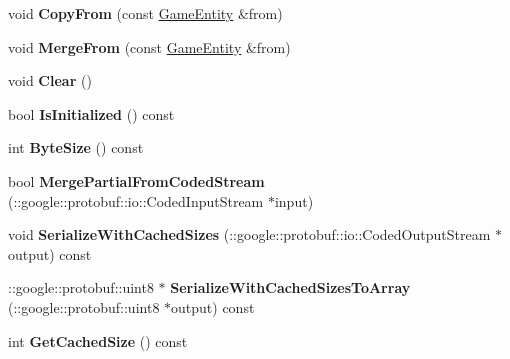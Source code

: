 \begin{DoxyCompactItemize}
\item 
\hypertarget{class_game_entity_ad2e29c89bb229fe7947d5ee8a61001fb}{}void {\bfseries Copy\+From} (const \hyperlink{class_game_entity}{Game\+Entity} \&from)\label{class_game_entity_ad2e29c89bb229fe7947d5ee8a61001fb}

\item 
\hypertarget{class_game_entity_aee3cabc70886a412c84f7046d8f0a28e}{}void {\bfseries Merge\+From} (const \hyperlink{class_game_entity}{Game\+Entity} \&from)\label{class_game_entity_aee3cabc70886a412c84f7046d8f0a28e}

\item 
\hypertarget{class_game_entity_afd155897472b7f1eb218556ce98d6a9b}{}void {\bfseries Clear} ()\label{class_game_entity_afd155897472b7f1eb218556ce98d6a9b}

\item 
\hypertarget{class_game_entity_afa6583197e095273509d30ad6592f56b}{}bool {\bfseries Is\+Initialized} () const \label{class_game_entity_afa6583197e095273509d30ad6592f56b}

\item 
\hypertarget{class_game_entity_a1427623c35bf6e2f89bb300e4d339141}{}int {\bfseries Byte\+Size} () const \label{class_game_entity_a1427623c35bf6e2f89bb300e4d339141}

\item 
\hypertarget{class_game_entity_a78b3ff51c8c5f3162abc072d080baabf}{}bool {\bfseries Merge\+Partial\+From\+Coded\+Stream} (\+::google\+::protobuf\+::io\+::\+Coded\+Input\+Stream $\ast$input)\label{class_game_entity_a78b3ff51c8c5f3162abc072d080baabf}

\item 
\hypertarget{class_game_entity_a704014c07ab7cb693c2b4590ca645b33}{}void {\bfseries Serialize\+With\+Cached\+Sizes} (\+::google\+::protobuf\+::io\+::\+Coded\+Output\+Stream $\ast$output) const \label{class_game_entity_a704014c07ab7cb693c2b4590ca645b33}

\item 
\hypertarget{class_game_entity_a9c3c2e602eb8393c6df678857757e035}{}\+::google\+::protobuf\+::uint8 $\ast$ {\bfseries Serialize\+With\+Cached\+Sizes\+To\+Array} (\+::google\+::protobuf\+::uint8 $\ast$output) const \label{class_game_entity_a9c3c2e602eb8393c6df678857757e035}

\item 
\hypertarget{class_game_entity_a48549bd37abe3683e99dd11146ef002f}{}int {\bfseries Get\+Cached\+Size} () const \label{class_game_entity_a48549bd37abe3683e99dd11146ef002f}


\end{DoxyCompactItemize}
